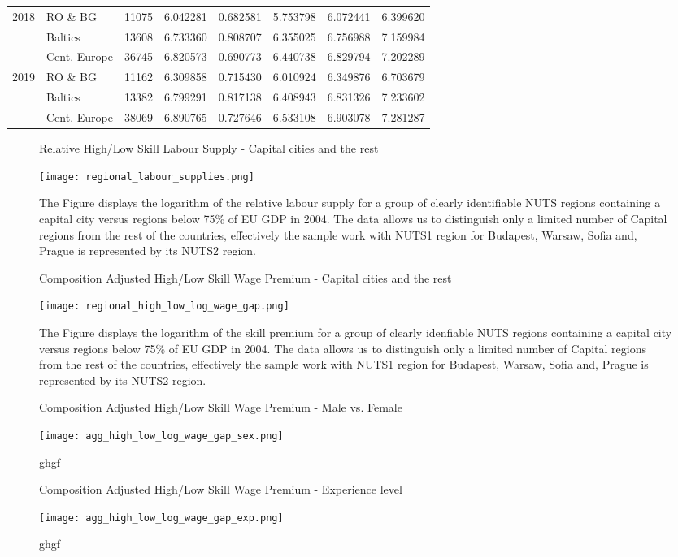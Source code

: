 \documentclass[11pt]{article}
\begin{document}
\begin{table}[!htbp]
{\begin{tabular}{llrrrrrr}
2018 & RO \& BG &  11075 &  6.042281 &  0.682581 &  5.753798 &  6.072441 &  6.399620 \\
     & Baltics &  13608 &  6.733360 &  0.808707 &  6.355025 &  6.756988 &  7.159984 \\
     & Cent. Europe &  36745 &  6.820573 &  0.690773 &  6.440738 &  6.829794 &  7.202289 \\
2019 & RO \& BG &  11162 &  6.309858 &  0.715430 &  6.010924 &  6.349876 &  6.703679 \\
     & Baltics &  13382 &  6.799291 &  0.817138 &  6.408943 &  6.831326 &  7.233602 \\
     & Cent. Europe &  38069 &  6.890765 &  0.727646 &  6.533108 &  6.903078 &  7.281287 \\
\bottomrule
\end{tabular}
}
\end{table}

\begin{figure}[!htbp]%
        \centering
        \caption{Relative High/Low Skill Labour Supply - Capital cities and the rest }
        {\texttt{[image: regional\_labour\_supplies.png]}}
        \label{regional_labour_supplies}
        \caption*{\footnotesize The Figure displays the logarithm of the relative labour supply for a group of clearly identifiable NUTS regions containing a capital city versus regions below 75\% of EU GDP in 2004. The data allows us to distinguish only a limited number of Capital regions from the rest of the countries, effectively the sample work with NUTS1 region for Budapest, Warsaw, Sofia and, Prague is represented by its NUTS2 region. }
\end{figure}


\begin{figure}[!htbp]%
        \centering
        \caption{Composition Adjusted High/Low Skill Wage Premium - Capital cities and the rest}
        {\texttt{[image: regional\_high\_low\_log\_wage\_gap.png]}}
        \label{regional_high_low_log_wage_gap}
        \caption*{\footnotesize  The Figure displays the logarithm of the skill premium for a group of clearly idenfiable NUTS regions containing a capital city versus regions below 75\% of EU GDP in 2004. The data allows us to distinguish only a limited number of Capital regions from the rest of the countries, effectively the sample work with NUTS1 region for Budapest, Warsaw, Sofia and, Prague is represented by its NUTS2 region.}
\end{figure}


\begin{figure}[!htbp]%
        \centering
        \caption{Composition Adjusted High/Low Skill Wage Premium - Male vs. Female }
        {\texttt{[image: agg\_high\_low\_log\_wage\_gap\_sex.png]}}
        \label{agg_high_low_log_wage_gap_sex}
        \caption*{\footnotesize ghgf }
\end{figure}

\begin{figure}[!htbp]%
        \centering
        \caption{Composition Adjusted High/Low Skill Wage Premium - Experience level }
        {\texttt{[image: agg\_high\_low\_log\_wage\_gap\_exp.png]}}
        \label{agg_high_low_log_wage_gap_exp}
        \caption*{\footnotesize ghgf }
\end{figure}
\end{document}
